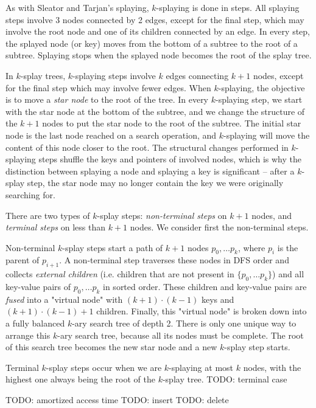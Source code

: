 As with Sleator and Tarjan's splaying, $k$-splaying is done in steps.
All splaying steps involve 3 nodes connected by 2 edges, except for the final
step, which may involve the root node and one of its children connected by
an edge. In every step, the splayed node (or key) moves from the bottom
of a subtree to the root of a subtree. Splaying stops when the splayed node
becomes the root of the splay tree.

In $k$-splay trees, $k$-splaying steps involve $k$ edges connecting
$k+1$ nodes, except for the final step which may involve fewer edges.
When $k$-splaying, the objective is to move a \textit{star node} to the
root of the tree. In every $k$-splaying step, we start with the star node
at the bottom of the subtree, and we change the structure of the $k+1$
nodes to put the star node to the root of the subtree.
The initial star node is the last node reached on a search operation, and
$k$-splaying will move the content of this node closer to the root.
The structural changes performed in $k$-splaying steps shuffle the keys and
pointers of involved nodes, which is why the distinction between splaying
a node and splaying a key is significant -- after a $k$-splay step,
the star node may no longer contain the key we were originally searching for.

There are two types of $k$-splay steps: \textit{non-terminal steps} on
$k+1$ nodes, and \textit{terminal steps} on less than $k+1$ nodes.
We consider first the non-terminal steps.

Non-terminal $k$-splay steps start a path of $k+1$ nodes $p_0,\ldots p_{k}$,
where $p_i$ is the parent of $p_{i+1}$. A non-terminal step traverses these
nodes in DFS order and collects \textit{external children} (i.e. children
that are not present in $\{p_0,\ldots p_k\}$) and all key-value pairs of
$p_0,\ldots p_k$ in sorted order.
These children and key-value pairs are \textit{fused} into a "virtual node"
with $(k+1)\cdot (k-1)$ keys and $(k+1)\cdot(k-1) + 1$ children. Finally,
this "virtual node" is broken down into a fully balanced $k$-ary
search tree of depth 2. There is only one unique way to arrange this
$k$-ary search tree, because all its nodes must be complete. The root of this
search tree becomes the new star node and a new $k$-splay step starts.

Terminal $k$-splay steps occur when we are $k$-splaying at most $k$
nodes, with the highest one always being the root of the $k$-splay tree.
TODO: terminal case

TODO: amortized access time
TODO: insert
TODO: delete
